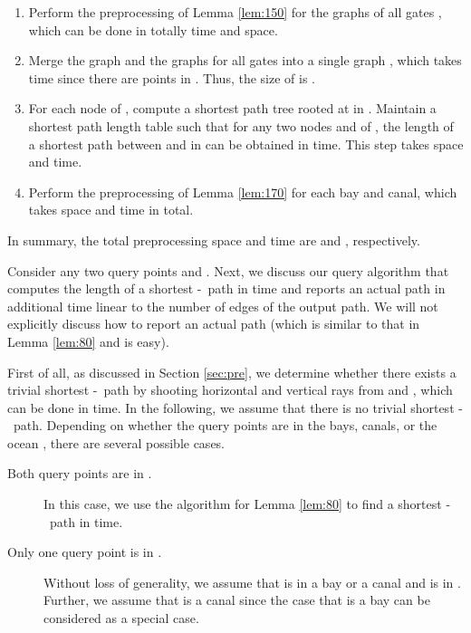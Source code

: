 \documentclass[english,runningheads,11pt]{llncs}
\def\st{-}
\newenvironment{proof}{\noindent {\textbf{Proof:}}\rm}{\hfill \rm}
\begin{document}
\begin{proof}
\begin{enumerate}
\item
Perform the preprocessing of Lemma \ref{lem:150} for the graphs  of
all gates , which can be done in totally  time and
 space.

\item
Merge the graph  and the graphs  for all gates
 into a single graph , which takes  time since there are  points in
.
Thus, the size of  is .

\item
For each node  of , compute a shortest path tree rooted at  in
. Maintain a shortest path length
table such that for any two nodes  and
 of , the length of a shortest path between  and
 in  can be obtained in  time. This step takes
 space and  time.

\item
Perform the preprocessing of Lemma \ref{lem:170} for each bay and canal,
which takes  space and  time in total.
\end{enumerate}

In summary, the total preprocessing space and time are
 and , respectively.

Consider any two query points  and .
Next, we discuss our query algorithm that computes the
length of a shortest \st\ path in  time and reports an
actual path in additional time linear to the number of edges of the output
path. We will not explicitly discuss how to report an
actual path (which is similar to that in Lemma \ref{lem:80} and is easy).

First of all, as discussed in Section \ref{sec:pre},
we determine whether there exists a trivial shortest
\st\ path by shooting horizontal and vertical rays from  and ,
which can be done in  time. In the following, we assume
that there is no trivial shortest \st\ path.
Depending on whether the query points are in the bays, canals, or the
ocean , there are several possible cases.

\begin{description}
\item[Both query points are in .]

In this case, we use the
algorithm for Lemma \ref{lem:80} to find a shortest \st\ path in
 time.

\item[Only one query point is in .]

Without loss of generality, we assume that  is in a bay or a canal  and
 is in . Further, we assume that  is a canal since the
case that  is a bay can be considered as a special case.


\end{description}
\end{proof}
\end{document}

